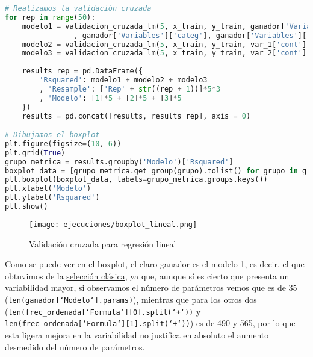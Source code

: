 \documentclass[a4paper,onecolumn]{extarticle}
\begin{document}
\begin{sloppypar}
\begin{lstlisting}[language=Python]
# Realizamos la validación cruzada
for rep in range(50):
    modelo1 = validacion_cruzada_lm(5, x_train, y_train, ganador['Variables']['cont']
                , ganador['Variables']['categ'], ganador['Variables']['inter'])
    modelo2 = validacion_cruzada_lm(5, x_train, y_train, var_1['cont'], var_1['categ'], var_1['inter'])
    modelo3 = validacion_cruzada_lm(5, x_train, y_train, var_2['cont'], var_2['categ'], var_2['inter'])
    
    results_rep = pd.DataFrame({
        'Rsquared': modelo1 + modelo2 + modelo3 
        , 'Resample': ['Rep' + str((rep + 1))]*5*3
        , 'Modelo': [1]*5 + [2]*5 + [3]*5 
    })
    results = pd.concat([results, results_rep], axis = 0)

# Dibujamos el boxplot
plt.figure(figsize=(10, 6))
plt.grid(True)
grupo_metrica = results.groupby('Modelo')['Rsquared']
boxplot_data = [grupo_metrica.get_group(grupo).tolist() for grupo in grupo_metrica.groups]
plt.boxplot(boxplot_data, labels=grupo_metrica.groups.keys()) 
plt.xlabel('Modelo')  
plt.ylabel('Rsquared') 
plt.show()  
\end{lstlisting}

\begin{center}
    \begin{figure}[h!]
        \texttt{[image: ejecuciones/boxplot\_lineal.png]}
        \caption{Validación cruzada para regresión lineal}
        \label{fig:boxplotlin}
    \end{figure}
\end{center}

Como se puede ver en el boxplot, el claro ganador es el modelo 1, es decir, el que obtuvimos de la \hyperref[linclasica]{selección clásica}, ya que, aunque 
sí es cierto que presenta un variabilidad mayor, si observamos el número de parámetros vemos que es de 35 (\texttt{len(ganador[`Modelo`].params)}), mientras que
para los otros dos (\texttt{len(frec\_ordenada[`Formula`][0].split(`+`))} y \texttt{len(frec\_ordenada[`Formula`][1].split(`+`))}) es de 490 y 565, por lo que 
esta ligera mejora en la variabilidad no justifica en absoluto el aumento desmedido del número de parámetros.


\end{sloppypar}
\end{document}

